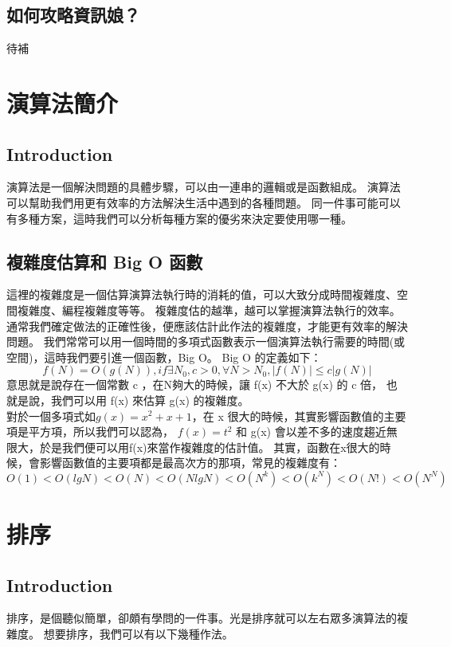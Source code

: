 \documentclass{article}
\begin{document}
\subsection{如何攻略資訊娘？}
待補


\section{演算法簡介}

\subsection{Introduction}
演算法是一個解決問題的具體步驟，可以由一連串的邏輯或是函數組成。
演算法可以幫助我們用更有效率的方法解決生活中遇到的各種問題。
同一件事可能可以有多種方案，這時我們可以分析每種方案的優劣來決定要使用哪一種。

\subsection{複雜度估算和 Big O 函數}
這裡的複雜度是一個估算演算法執行時的消耗的值，可以大致分成時間複雜度、空間複雜度、編程複雜度等等。
複雜度估的越準，越可以掌握演算法執行的效率。
通常我們確定做法的正確性後，便應該估計此作法的複雜度，才能更有效率的解決問題。
我們常常可以用一個時間的多項式函數表示一個演算法執行需要的時間(或空間)，這時我們要引進一個函數，Big O。
Big O 的定義如下：\[f(N) = O(g(N)), if \exists N_0, c > 0,  \forall N > N_0, |f(N)| ≤ c|g(N)|\]
意思就是說存在一個常數 c ，在N夠大的時候，讓 f(x) 不大於 g(x) 的 c 倍，
也就是說，我們可以用 f(x) 來估算 g(x) 的複雜度。\\
對於一個多項式如$g(x) = x^2 + x + 1$，在 x 很大的時候，其實影響函數值的主要項是平方項，所以我們可以認為，
$f(x) = t^2$ 和 g(x) 會以差不多的速度趨近無限大，於是我們便可以用f(x)來當作複雜度的估計值。
其實，函數在x很大的時候，會影響函數值的主要項都是最高次方的那項，常見的複雜度有：
\[O(1) < O(lg N) < O(N) < O(N lg N) < O(N^k) < O(k^N ) < O(N!) < O(N^N)\]


\section{排序}

\subsection*{Introduction}
排序，是個聽似簡單，卻頗有學問的一件事。光是排序就可以左右眾多演算法的複雜度。
想要排序，我們可以有以下幾種作法。
\end{document}
